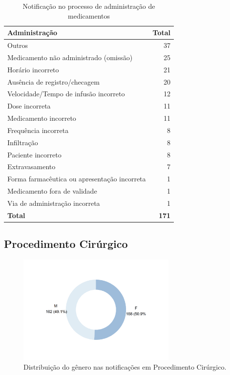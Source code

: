 \documentclass[
  a4paper]{article}
\begin{document}
\begin{table}[H]

\caption{\label{tab:unnamed-chunk-38}Notificação no processo de administração de medicamentos}
\centering
\begin{tabular}[t]{lr}
\toprule
Administração & Total\\
\midrule
Outros & 37\\
Medicamento não administrado (omissão) & 25\\
Horário incorreto & 21\\
Ausência de registro/checagem & 20\\
Velocidade/Tempo de infusão incorreto & 12\\
\addlinespace
Dose incorreta & 11\\
Medicamento incorreto & 11\\
Frequência incorreta & 8\\
Infiltração & 8\\
Paciente incorreto & 8\\
\addlinespace
Extravasamento & 7\\
Forma farmacêutica ou apresentação incorreta & 1\\
Medicamento fora de validade & 1\\
Via de administração incorreta & 1\\
\midrule
\textbf{Total} & \textbf{171}\\
\bottomrule
\end{tabular}
\end{table}

\subsection{Procedimento Cirúrgico}

\begin{figure}[H]
\caption{Distribuição do gênero nas notificações em Procedimento Cirúrgico.}
\includegraphics[width=0.7\textwidth]{Imagens/cirurg_SEXO.png}
\end{figure}
\end{document}
